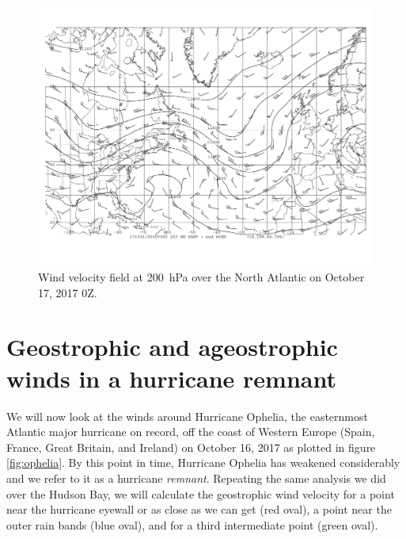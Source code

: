 \documentclass[11pt]{article}
\begin{document}
\begin{figure}[h!]
	\centering
	\includegraphics[trim={0.5cm 2cm 0.5cm 0},clip,width=\textwidth]{200hPa_hght_wind_jet_inout}
	\caption{Wind velocity field at \SI{200}{\hecto\Pa} over the North Atlantic on October 17, 2017 0Z.}
	\label{fig:jet}
\end{figure}

\section{Geostrophic and ageostrophic winds in a hurricane remnant}
We will now look at the winds around Hurricane Ophelia, the easternmost Atlantic major hurricane on record, off the coast of Western Europe (Spain, France, Great Britain, and Ireland) on October 16, 2017 as plotted in figure \ref{fig:ophelia}. By this point in time, Hurricane Ophelia has weakened considerably and we refer to it as a hurricane \emph{remnant}. Repeating the same analysis we did over the Hudson Bay, we will calculate the geostrophic wind velocity for a point near the hurricane eyewall or as close as we can get (red oval), a point near the outer rain bands (blue oval), and for a third intermediate point (green oval).
\end{document}
